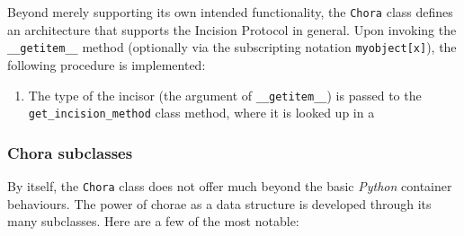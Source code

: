 \documentclass[a4paper,11pt,oneside]{book}
\begin{document}
Beyond merely supporting its own intended functionality, the \texttt{Chora} class defines an architecture that supports the Incision Protocol in general. Upon invoking the \texttt{\_\_getitem\_\_} method (optionally via the subscripting notation \texttt{myobject[x]}), the following procedure is implemented:

\begin{enumerate}
\item The type of the incisor (the argument of \texttt{\_\_getitem\_\_}) is passed to the \texttt{get\_incision\_method} class method, where it is looked up in a
\end{enumerate}

\subsubsection{Chora subclasses}

By itself, the \texttt{Chora} class does not offer much beyond the basic \textit{Python} container behaviours. The power of chorae as a data structure is developed through its many subclasses. Here are a few of the most notable:
\end{document}
